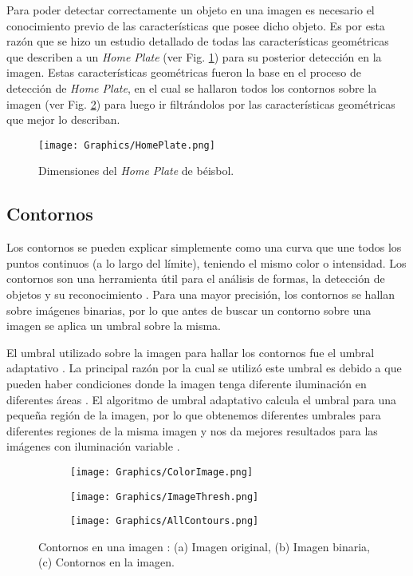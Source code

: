 Para poder detectar correctamente un objeto en una imagen es necesario el conocimiento previo de las características que posee dicho objeto. Es por esta razón que se hizo un estudio detallado de todas las características geométricas que describen a un \textit{Home Plate} (ver Fig. \ref{fig:HomePlateDimentions}) para su posterior detección en la imagen. Estas características geométricas fueron la base en el proceso de detección de \textit{Home Plate}, en el cual se hallaron todos los contornos sobre la imagen (ver Fig. \ref{fig:ImagesContours}) para luego ir filtrándolos por las características geométricas que mejor lo describan.

\begin{figure}[!h]
    \centering
    \texttt{[image: Graphics/HomePlate.png]}
    \caption{Dimensiones del \textit{Home Plate} de béisbol.}
    \label{fig:HomePlateDimentions}
\end{figure}

\subsection{Contornos}

Los contornos se pueden explicar simplemente como una curva que une todos los puntos continuos (a lo largo del límite), teniendo el mismo color o intensidad. Los contornos son una herramienta útil para el análisis de formas, la detección de objetos y su reconocimiento \cite{Contours}. Para una mayor precisión, los contornos se hallan sobre imágenes binarias, por lo que antes de buscar un contorno sobre una imagen se aplica un umbral sobre la misma.

El umbral utilizado sobre la imagen para hallar los contornos fue el umbral adaptativo \cite{AdaptiveThreshold}. La principal razón por la cual se utilizó este umbral es debido a que pueden haber condiciones donde la imagen tenga diferente iluminación en diferentes áreas \cite{AdaptiveThresholdOpenCV}. El algoritmo de umbral adaptativo calcula el umbral para una pequeña región de la imagen, por lo que obtenemos diferentes umbrales para diferentes regiones de la misma imagen y nos da mejores resultados para las imágenes con iluminación variable \cite{AdaptiveThresholdOpenCV}.

\begin{figure}[h!]
	\centering
	\begin{subfigure}[b]{0.32\linewidth}
		\centering
		\texttt{[image: Graphics/ColorImage.png]}
		\caption{}
	\end{subfigure}
	\begin{subfigure}[b]{0.32\linewidth}
		\centering
		\texttt{[image: Graphics/ImageThresh.png]}
		\caption{}
	\end{subfigure}    
	\begin{subfigure}[b]{0.32\linewidth}
		\centering
		\texttt{[image: Graphics/AllContours.png]}
		\caption{}
	\end{subfigure}    
	\caption{Contornos en una imagen : (a) Imagen original, (b) Imagen binaria, (c) Contornos en la imagen.}
	\label{fig:ImagesContours}
\end{figure}    

